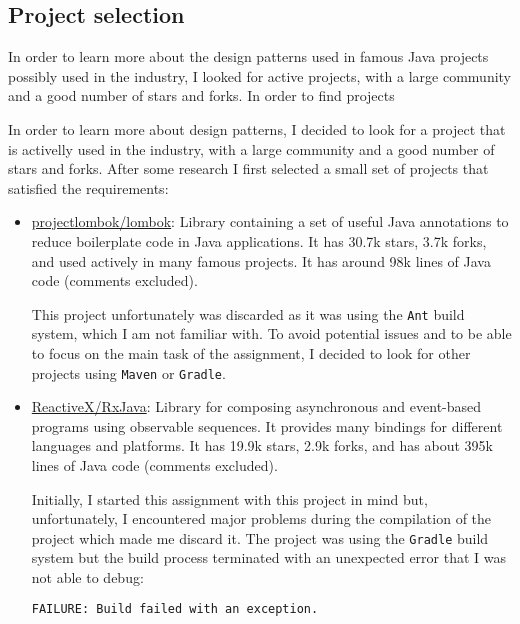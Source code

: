 \documentclass[a4paper, 11pt]{article}
\begin{document}
\subsection{Project selection}

In order to learn more about the design patterns used in famous Java projects possibly used in the industry, I looked for active projects, with a large community and a good number of stars and forks. In order to find projects

In order to learn more about design patterns, I decided to look for a project that is activelly used in the industry, with a large community and a good number of stars and forks. After some research I first selected a small set of projects that satisfied the requirements:

\begin{itemize}
	\item \href{https://github.com/projectlombok/lombok}{projectlombok/lombok}: Library containing a set of useful Java annotations to reduce boilerplate code in Java applications. It has 30.7k stars, 3.7k forks, and used actively in many famous projects. It has around 98k lines of Java code (comments excluded).

	      This project unfortunately was discarded as it was using the \texttt{Ant} build system, which I am not familiar with. To avoid potential issues and to be able to focus on the main task of the assignment, I decided to look for other projects using \texttt{Maven} or \texttt{Gradle}.

	\item \href{https://github.com/ReactiveX/RxJava}{ReactiveX/RxJava}: Library for composing asynchronous and event-based programs using observable sequences. It provides many bindings for different languages and platforms. It has 19.9k stars, 2.9k forks, and has about 395k lines of Java code (comments excluded).

	      Initially, I started this assignment with this project in mind but, unfortunately, I encountered major problems during the compilation of the project which made me discard it. The project was using the \texttt{Gradle} build system but the build process terminated with an unexpected error that I was not able to debug:

	      \begin{lstlisting}[language=bash, caption={Error during compilation of RxJava project}, breaklines=true, captionpos=b]
FAILURE: Build failed with an exception.


\end{lstlisting}
\end{itemize}
\end{document}
